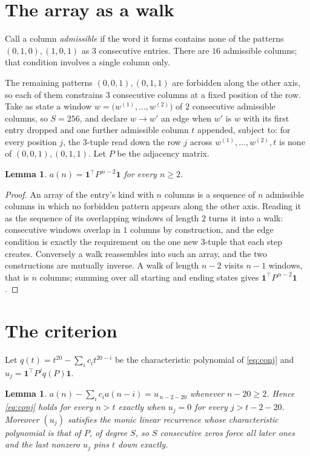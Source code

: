 \documentclass[11pt,a4paper]{article}
\theoremstyle{plain}
\newtheorem{lemma}[theorem]{Lemma}
\theoremstyle{definition}
\begin{document}
\section{The array as a walk}

Call a column \emph{admissible} if the word it forms contains none of the patterns
$(0,1,0), (1,0,1)$ as $3$ consecutive entries. There are $16$ admissible columns; that condition
involves a single column only.

The remaining patterns $(0,0,1), (0,1,1)$ are forbidden along the other axis, so each of them
constrains $3$ consecutive columns at a fixed position of the row. Take as state a
window $w=\bigl(w^{(1)},\dots,w^{(2)}\bigr)$ of $2$ consecutive admissible
columns, so $S=256$, and declare $w\to w'$ an edge when $w'$ is $w$ with its first entry
dropped and one further admissible column $t$ appended, subject to: for every position
$j$, the $3$-tuple read down the row $j$ across $w^{(1)},\dots,w^{(2)},t$
is none of $(0,0,1), (0,1,1)$. Let $P$ be the adjacency matrix.

\begin{lemma}\label{lem:walk}
$a(n)=\mathbf{1}^{\!\top}P^{\,n-2}\mathbf{1}$ for every $n\ge2$.
\end{lemma}

\begin{proof}
An array of the entry's kind with $n$ columns is a sequence of $n$ admissible columns in
which no forbidden pattern appears along the other axis. Reading it as the sequence of its
overlapping windows of length $2$ turns it into a walk: consecutive windows overlap in
$1$ columns by construction, and the edge condition is exactly the requirement on the one
new $3$-tuple that each step creates. Conversely a walk reassembles into such an array,
and the two constructions are mutually inverse. A walk of length $n-2$ visits $n-1$
windows, that is $n$ columns; summing over all starting and ending states gives
$\mathbf{1}^{\!\top}P^{\,n-2}\mathbf{1}$.
\end{proof}

\section{The criterion}

Let $q(t)=t^{20}-\sum_i c_i t^{20-i}$ be the characteristic polynomial of
\eqref{eq:conj} and $u_j=\mathbf{1}^{\!\top}P^{j}q(P)\mathbf{1}$.

\begin{lemma}\label{lem:crit}
$a(n)-\sum_i c_i a(n-i)=u_{\,n-2-20}$ whenever $n-20\ge2$. Hence
\eqref{eq:conj} holds for every $n>t$ exactly when $u_j=0$ for every
$j>t-2-20$. Moreover $(u_j)$ satisfies the monic linear recurrence whose
characteristic polynomial is that of $P$, of degree $S$, so $S$ consecutive zeros force all
later ones and the last nonzero $u_j$ pins $t$ down exactly.
\end{lemma}
\end{document}
